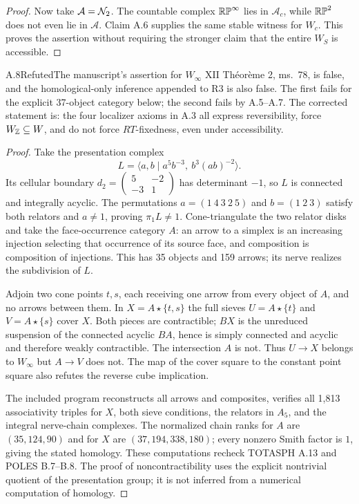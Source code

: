 \begin{proof}
Now take $\mathcal A=\mathcal N_2$. The countable complex $\mathbb{RP}^\infty$ lies in $\mathcal A_c$, while $\mathbb{RP}^2$ does not even lie in $\mathcal A$. Claim A.6 supplies the same stable witness for $W_c$. This proves the assertion without requiring the stronger claim that the entire $W_S$ is accessible.
\end{proof}

\begin{claim}{A.8}{Refuted}{The manuscript's assertion for $W_\infty$}\label{A8}
XII Théorème 2, ms.~78, is false, and the homological-only inference appended to R3 is also false. The first fails for the explicit 37-object category below; the second fails by A.5--A.7. The corrected statement is: the four localizer axioms in A.3 all express reversibility, force $W_\mathbb Z\subseteq W$, and do not force $RT$-fixedness, even under accessibility.
\end{claim}
\begin{proof}
Take the presentation complex
\[
 L=\langle a,b\mid a^5b^{-3},\ b^3(ab)^{-2}\rangle.
\]
Its cellular boundary $d_2=\left(\begin{smallmatrix}5&-2\\-3&1\end{smallmatrix}\right)$ has determinant $-1$, so $L$ is connected and integrally acyclic. The permutations $a=(1\ 4\ 3\ 2\ 5)$ and $b=(1\ 2\ 3)$ satisfy both relators and $a\ne1$, proving $\pi_1L\ne1$. Cone-triangulate the two relator disks and take the face-occurrence category $A$: an arrow to a simplex is an increasing injection selecting that occurrence of its source face, and composition is composition of injections. This has 35 objects and 159 arrows; its nerve realizes the subdivision of $L$.

Adjoin two cone points $t,s$, each receiving one arrow from every object of $A$, and no arrows between them. In $X=A\star\{t,s\}$ the full sieves $U=A\star\{t\}$ and $V=A\star\{s\}$ cover $X$. Both pieces are contractible; $BX$ is the unreduced suspension of the connected acyclic $BA$, hence is simply connected and acyclic and therefore weakly contractible. The intersection $A$ is not. Thus $U\to X$ belongs to $W_\infty$ but $A\to V$ does not. The map of the cover square to the constant point square also refutes the reverse cube implication.

The included program reconstructs all arrows and composites, verifies all 1,813 associativity triples for $X$, both sieve conditions, the relators in $A_5$, and the integral nerve-chain complexes. The normalized chain ranks for $A$ are $(35,124,90)$ and for $X$ are $(37,194,338,180)$; every nonzero Smith factor is $1$, giving the stated homology. These computations recheck TOTASPH A.13 and POLES B.7--B.8. The proof of noncontractibility uses the explicit nontrivial quotient of the presentation group; it is not inferred from a numerical computation of homology.
\end{proof}

